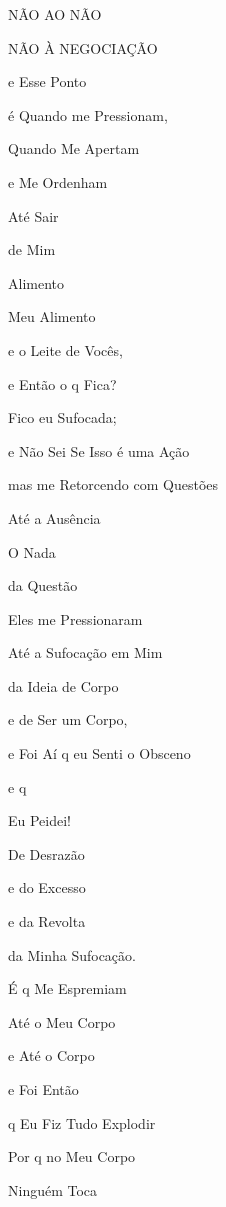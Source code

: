 
NÃO AO NÃO

NÃO À NEGOCIAÇÃO


e Esse Ponto

é Quando me Pressionam,

Quando Me Apertam

e Me Ordenham

Até Sair

de Mim

Alimento

Meu Alimento

e o Leite de Vocês,

e Então o q Fica?

Fico eu Sufocada;

e Não Sei Se Isso é uma Ação

mas me Retorcendo com Questões

Até a Ausência

O Nada

da Questão

Eles me Pressionaram

Até a Sufocação em Mim

da Ideia de Corpo

e de Ser um Corpo,

e Foi Aí q eu Senti o Obsceno

e q

Eu Peidei!

De Desrazão

e do Excesso

e da Revolta \EP[1]

da Minha Sufocação.

É q Me Espremiam

Até o Meu Corpo

e Até o Corpo

e Foi Então

q Eu Fiz Tudo Explodir



Por q no Meu Corpo

Ninguém Toca


